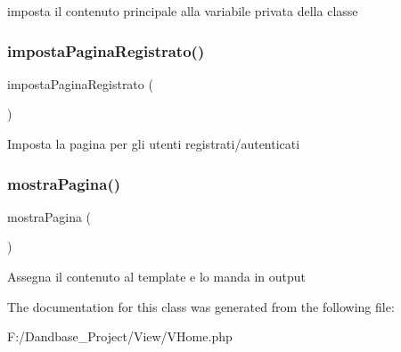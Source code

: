imposta il contenuto principale alla variabile privata della classe \mbox{\label{class_v_home_a19d02ab00682bacf312e22ad6494ceec}} 
\subsubsection{\texorpdfstring{imposta\+Pagina\+Registrato()}{impostaPaginaRegistrato()}}
{\footnotesize\ttfamily imposta\+Pagina\+Registrato (\begin{DoxyParamCaption}{ }\end{DoxyParamCaption})}

Imposta la pagina per gli utenti registrati/autenticati \mbox{\label{class_v_home_a46759d4232bd0607baff37daa710b4fb}} 
\subsubsection{\texorpdfstring{mostra\+Pagina()}{mostraPagina()}}
{\footnotesize\ttfamily mostra\+Pagina (\begin{DoxyParamCaption}{ }\end{DoxyParamCaption})}

Assegna il contenuto al template e lo manda in output 

The documentation for this class was generated from the following file\+:\begin{DoxyCompactItemize}
\item 
F\+:/\+Dandbase\+\_\+\+Project/\+View/V\+Home.\+php\end{DoxyCompactItemize}
